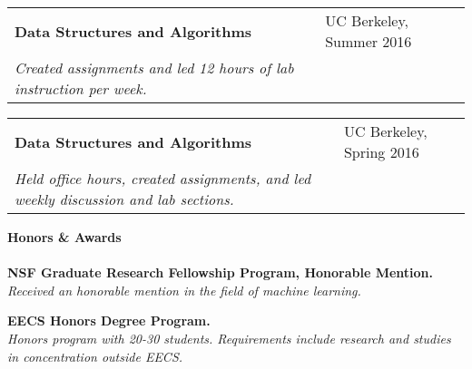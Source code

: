 \documentclass{article}
\begin{document}
\vspace{0.5mm}
\begin{tabular}{@{}p{}p{}@{}}
\textbf{Data Structures and Algorithms} & UC Berkeley, Summer 2016 \\
\indent
\hspace{1.5mm}
\textit{Created assignments and led 12 hours of lab instruction per week.} \\
\end{tabular}
\vspace{0.5mm}
\begin{tabular}{@{}p{}p{}@{}}
\textbf{Data Structures and Algorithms} & UC Berkeley, Spring 2016 \\
\indent
\hspace{1.5mm}
\textit{Held office hours, created assignments, and led weekly discussion and lab sections.}
\end{tabular}
\vspace{3.0mm}

\noindent
\textbf{{\Large Honors \& Awards}}\\[-2mm]
\HRule\\
\hspace*{0mm}\textbf{NSF Graduate Research Fellowship Program, Honorable Mention.} \\
\hspace*{1.5mm}
\textit{Received an honorable mention in the field of machine learning. }\\
\vspace{-3mm}

\noindent
\textbf{EECS Honors Degree Program.} \\
\hspace*{1.5mm} \textit{Honors program with 20-30 students. Requirements include research and studies in concentration outside EECS.} \\
\vspace{-3mm}
\end{document}
